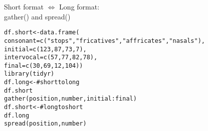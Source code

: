 \begin{frame}[fragile]{Short format $\Leftrightarrow$ Long format:\\gather() and spread()}
\scriptsize
\begin{alltt}
df.short <- data.frame(
                            consonant = c("stops", "fricatives", "affricates", "nasals"),
                            initial = c(123, 87, 73, 7),
                            intervocal = c(57, 77, 82, 78),
                            final = c(30, 69, 12, 104)) \bigskip
\alert{library(tidyr)}
df.long <- \hfill # short to long
      df.short %>%
      \alert{gather}(position, number, initial:final) \bigskip
df.short<- \hfill # long to short
      df.long %>%
      \alert{spread}(position, number)
\end{alltt}
\normalsize
\end{frame}
